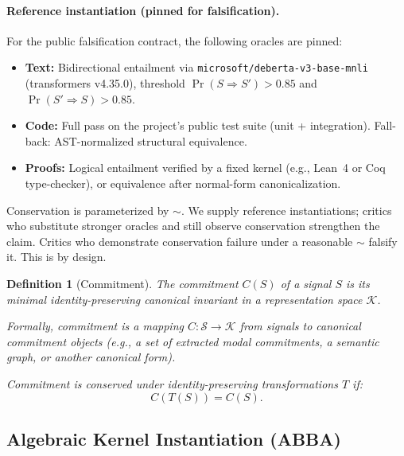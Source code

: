 \documentclass[11pt,a4paper]{article}
\newtheorem{definition}[theorem]{Definition}
\begin{document}
\paragraph{Reference instantiation (pinned for falsification).}
For the public falsification contract, the following oracles are pinned:
\begin{itemize}
    \item \textbf{Text:} Bidirectional entailment via \texttt{microsoft/deberta-v3-base-mnli} (transformers v4.35.0), threshold $\Pr(S \Rightarrow S') > 0.85$ and $\Pr(S' \Rightarrow S) > 0.85$.
    \item \textbf{Code:} Full pass on the project's public test suite (unit + integration). Fall-back: AST-normalized structural equivalence.
    \item \textbf{Proofs:} Logical entailment verified by a fixed kernel (e.g., Lean~4 or Coq type-checker), or equivalence after normal-form canonicalization.
\end{itemize}
Conservation is parameterized by $\sim$. We supply reference instantiations; critics who substitute stronger oracles and still observe conservation strengthen the claim. Critics who demonstrate conservation failure under a reasonable $\sim$ falsify it. This is by design.

\begin{definition}[Commitment]
\label{def:commitment}
The commitment $C(S)$ of a signal $S$ is its minimal identity-preserving \emph{canonical invariant} in a representation space $\mathcal{K}$.

Formally, commitment is a mapping $C: \mathcal{S} \rightarrow \mathcal{K}$ from signals to canonical commitment objects (e.g., a set of extracted modal commitments, a semantic graph, or another canonical form).

Commitment is conserved under identity-preserving transformations $T$ if:
\begin{equation}
C(T(S)) = C(S).
\end{equation}
\end{definition}

\subsection{Algebraic Kernel Instantiation (ABBA)}
\label{sec:abba-kernel}
\end{document}
